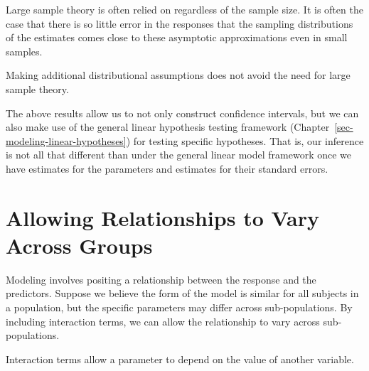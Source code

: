 \documentclass[
  letterpaper,
  DIV=11,
  numbers=noendperiod]{scrreprt}
\theoremstyle{definition}
\theoremstyle{definition}
\theoremstyle{remark}
\begin{document}
\begin{tcolorbox}[enhanced jigsaw, left=2mm, toprule=.15mm, arc=.35mm, breakable, opacitybacktitle=0.6, opacityback=0, rightrule=.15mm, colbacktitle=quarto-callout-note-color!10!white, coltitle=black, leftrule=.75mm, toptitle=1mm, colframe=quarto-callout-note-color-frame, titlerule=0mm, title=\textcolor{quarto-callout-note-color}{\faInfo}\hspace{0.5em}{Note}, bottomrule=.15mm, colback=white, bottomtitle=1mm]

Large sample theory is often relied on regardless of the sample size. It
is often the case that there is so little error in the responses that
the sampling distributions of the estimates comes close to these
asymptotic approximations even in small samples.

Making additional distributional assumptions does not avoid the need for
large sample theory.

\end{tcolorbox}

The above results allow us to not only construct confidence intervals,
but we can also make use of the general linear hypothesis testing
framework (Chapter~\ref{sec-modeling-linear-hypotheses}) for testing
specific hypotheses. That is, our inference is not all that different
than under the general linear model framework once we have estimates for
the parameters and estimates for their standard errors.

\hypertarget{allowing-relationships-to-vary-across-groups}{%
\section{Allowing Relationships to Vary Across
Groups}\label{allowing-relationships-to-vary-across-groups}}

Modeling involves positing a relationship between the response and the
predictors. Suppose we believe the form of the model is similar for all
subjects in a population, but the specific parameters may differ across
sub-populations. By including interaction terms, we can allow the
relationship to vary across sub-populations.

\begin{tcolorbox}[enhanced jigsaw, left=2mm, toprule=.15mm, arc=.35mm, breakable, opacitybacktitle=0.6, opacityback=0, rightrule=.15mm, colbacktitle=quarto-callout-tip-color!10!white, coltitle=black, leftrule=.75mm, toptitle=1mm, colframe=quarto-callout-tip-color-frame, titlerule=0mm, title=\textcolor{quarto-callout-tip-color}{\faLightbulb}\hspace{0.5em}{Big Idea}, bottomrule=.15mm, colback=white, bottomtitle=1mm]

Interaction terms allow a parameter to depend on the value of another
variable.

\end{tcolorbox}
\end{document}
